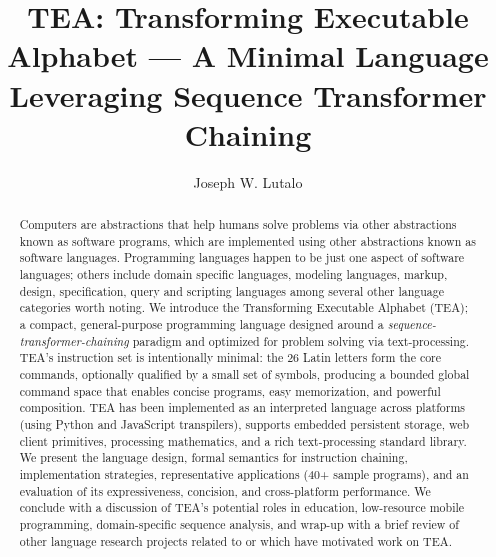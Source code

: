 \documentclass[acmtoplas]{acmart}
\title{TEA: Transforming Executable Alphabet --- A Minimal Language Leveraging Sequence Transformer Chaining}
\author{Joseph W. Lutalo}
\affiliation{%
  \institution{Nuchwezi Research}
  \country{Uganda}}
\begin{document}
%

%


\begin{abstract}
Computers are abstractions that help humans solve problems via other abstractions known as software programs, which are implemented using other abstractions known as software languages. Programming languages happen to be just one aspect of software languages; others include domain specific languages, modeling languages, markup, design, specification, query and scripting languages among several other language categories worth noting. We introduce the Transforming Executable Alphabet (TEA); a compact, general-purpose programming language designed around a \emph{sequence-transformer-chaining} paradigm and optimized for problem solving via text-processing. TEA's instruction set is intentionally minimal: the 26 Latin letters form the core commands, optionally qualified by a small set of symbols, producing a bounded global command space that enables concise programs, easy memorization, and powerful composition. TEA has been implemented as an interpreted language across platforms (using Python and JavaScript transpilers), supports embedded persistent storage, web client primitives, processing mathematics, and a rich text-processing standard library. We present the language design, formal semantics for instruction chaining, implementation strategies, representative applications (40+ sample programs), and an evaluation of its expressiveness, concision, and cross-platform performance. We conclude with a discussion of TEA's potential roles in education, low-resource mobile programming, domain-specific sequence analysis, and wrap-up with a brief review of other language research projects related to or which have motivated work on TEA.
\end{abstract}


\end{document}
